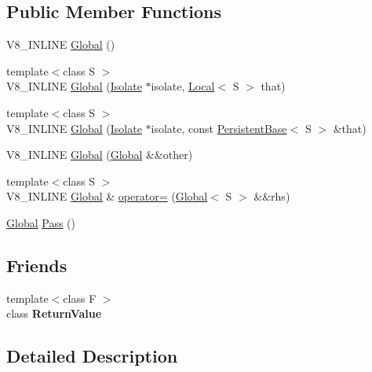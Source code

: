 \subsection*{Public Member Functions}
\begin{DoxyCompactItemize}
\item 
V8\+\_\+\+I\+N\+L\+I\+NE \hyperlink{classv8_1_1Global_ab1efdf25ff6305e67f3266a6fe90527e}{Global} ()
\item 
{\footnotesize template$<$class S $>$ }\\V8\+\_\+\+I\+N\+L\+I\+NE \hyperlink{classv8_1_1Global_a8434bb6729eb4cd0cd85ad81bd8344ad}{Global} (\hyperlink{classv8_1_1Isolate}{Isolate} $\ast$isolate, \hyperlink{classv8_1_1Local}{Local}$<$ S $>$ that)
\item 
{\footnotesize template$<$class S $>$ }\\V8\+\_\+\+I\+N\+L\+I\+NE \hyperlink{classv8_1_1Global_a6243ecb28bb97d066065796fa28f7415}{Global} (\hyperlink{classv8_1_1Isolate}{Isolate} $\ast$isolate, const \hyperlink{classv8_1_1PersistentBase}{Persistent\+Base}$<$ S $>$ \&that)
\item 
V8\+\_\+\+I\+N\+L\+I\+NE \hyperlink{classv8_1_1Global_ab8f3c754a58146e6db67012cd74a49cb}{Global} (\hyperlink{classv8_1_1Global}{Global} \&\&other)
\item 
{\footnotesize template$<$class S $>$ }\\V8\+\_\+\+I\+N\+L\+I\+NE \hyperlink{classv8_1_1Global}{Global} \& \hyperlink{classv8_1_1Global_a9d3d7d8f10ad23e413f2027cc15ab209}{operator=} (\hyperlink{classv8_1_1Global}{Global}$<$ S $>$ \&\&rhs)
\item 
\hyperlink{classv8_1_1Global}{Global} \hyperlink{classv8_1_1Global_a914903149cc752468d4a3a11b6089c7e}{Pass} ()
\end{DoxyCompactItemize}
\subsection*{Friends}
\begin{DoxyCompactItemize}
\item 
{\footnotesize template$<$class F $>$ }\\class {\bfseries Return\+Value}\hypertarget{classv8_1_1Global_a53f604d3d6f2dc0647df33c9979f116a}{}\label{classv8_1_1Global_a53f604d3d6f2dc0647df33c9979f116a}

\end{DoxyCompactItemize}


\subsection{Detailed Description}
